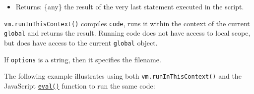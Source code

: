 \begin{itemize}
\begin{itemize}
    \begin{itemize}
    \tightlist
    \item
      \texttt{specifier} \{string\} specifier passed to
      \texttt{import()}
    \item
      \texttt{script} \{vm.Script\}
    \item
      \texttt{importAttributes} \{Object\} The \texttt{"with"} value
      passed to the
      \href{https://tc39.es/proposal-import-attributes/\#sec-evaluate-import-call}{\texttt{optionsExpression}}
      optional parameter, or an empty object if no value was provided.
    \item
      Returns: \{Module Namespace Object\textbar vm.Module\} Returning a
      \texttt{vm.Module} is recommended in order to take advantage of
      error tracking, and to avoid issues with namespaces that contain
      \texttt{then} function exports.
    \end{itemize}
  \end{itemize}
\item
  Returns: \{any\} the result of the very last statement executed in the
  script.
\end{itemize}

\texttt{vm.runInThisContext()} compiles \texttt{code}, runs it within
the context of the current \texttt{global} and returns the result.
Running code does not have access to local scope, but does have access
to the current \texttt{global} object.

If \texttt{options} is a string, then it specifies the filename.

The following example illustrates using both
\texttt{vm.runInThisContext()} and the JavaScript
\href{https://developer.mozilla.org/en-US/docs/Web/JavaScript/Reference/Global_Objects/eval}{\texttt{eval()}}
function to run the same code:

